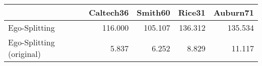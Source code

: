 \begin{tabular}{lrrrr}
\toprule
{} & Caltech36 & Smith60 &  Rice31 & Auburn71 \\
\midrule
Ego-Splitting            &   116.000 & 105.107 & 136.312 &  135.534 \\
Ego-Splitting (original) &     5.837 &   6.252 &   8.829 &   11.117 \\
\bottomrule
\end{tabular}

